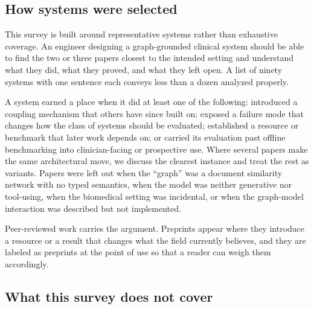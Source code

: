 \subsection{How systems were selected}

This survey is built around representative systems rather than exhaustive coverage. An engineer designing a graph-grounded clinical system should be able to find the two or three papers closest to the intended setting and understand what they did, what they proved, and what they left open. A list of ninety systems with one sentence each conveys less than a dozen analyzed properly.

A system earned a place when it did at least one of the following: introduced a coupling mechanism that others have since built on; exposed a failure mode that changes how the class of systems should be evaluated; established a resource or benchmark that later work depends on; or carried its evaluation past offline benchmarking into clinician-facing or prospective use. Where several papers make the same architectural move, we discuss the clearest instance and treat the rest as variants. Papers were left out when the ``graph'' was a document similarity network with no typed semantics, when the model was neither generative nor tool-using, when the biomedical setting was incidental, or when the graph-model interaction was described but not implemented.


Peer-reviewed work carries the argument. Preprints appear where they introduce a resource or a result that changes what the field currently believes, and they are labeled as preprints at the point of use so that a reader can weigh them accordingly.

\subsection{What this survey does not cover}

